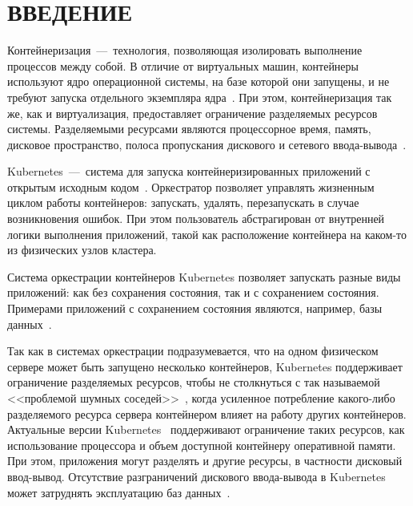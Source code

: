 \chapter*{ВВЕДЕНИЕ}

Контейнеризация~---~технология, позволяющая изолировать выполнение процессов между собой. В отличие от виртуальных машин, контейнеры используют ядро операционной системы, на базе которой они запущены, и не требуют запуска отдельного экземпляра ядра~\cite{luksa2017kubernetes}. При этом, контейнеризация так же, как и виртуализация, предоставляет ограничение разделяемых ресурсов системы. Разделяемыми ресурсами являются процессорное время, память, дисковое пространство, полоса пропускания дискового и сетевого ввода-вывода~\cite{cgroups}\cite{кузьминский2012контрольные}.

Kubernetes~---~система для запуска контейнеризированных приложений с открытым исходным кодом~\cite{kubernetes}. Оркестратор позволяет управлять жизненным циклом работы контейнеров: запускать, удалять, перезапускать в случае возникновения ошибок. При этом пользователь абстрагирован от внутренней логики выполнения приложений, такой как расположение контейнера на каком-то из физических узлов кластера.

Система оркестрации контейнеров Kubernetes позволяет запускать разные виды приложений: как без сохранения состояния, так и с сохранением состояния. Примерами приложений с сохранением состояния являются, например, базы данных~\cite{vayghan2021kubernetes}. 

Так как в системах оркестрации подразумевается, что на одном физическом сервере может быть запущено несколько контейнеров, Kubernetes поддерживает ограничение разделяемых ресурсов, чтобы не столкнуться с так называемой <<проблемой шумных соседей>>~\cite{makroo2016systematic}, когда усиленное потребление какого-либо разделяемого ресурса сервера контейнером влияет на работу других контейнеров. Актуальные версии Kubernetes~\cite{kubernetes} поддерживают ограничение таких ресурсов, как использование процессора и объем доступной контейнеру оперативной памяти. При этом, приложения могут разделять и другие ресурсы, в частности дисковый ввод-вывод. Отсутствие разграничений дискового ввода-вывода в Kubernetes может затруднять эксплуатацию баз данных~\cite{avito_database_meetup}\cite{phdays}.
